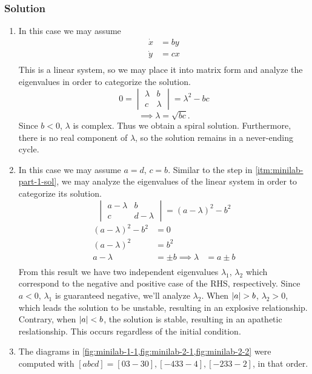 \documentclass[12pt]{article}
\begin{document}
\subsubsection*{Solution}
\begin{enumerate}
\item
  \label{itm:minilab-part-1-sol}
  In this case we may assume
  \begin{equation*}
    \begin{aligned}
      \dot{x} &= by \\
      \dot{y} &= cx \\
    \end{aligned}
  \end{equation*}
  This is a linear system, so we may place it into matrix form and analyze the
  eigenvalues in order to categorize the solution.
  \begin{equation*}
    0=\begin{vmatrix} \lambda & b \\ c & \lambda \end{vmatrix} = \lambda^2-bc
  \end{equation*}
  \begin{equation*}
    \implies \lambda = \sqrt{bc}.
  \end{equation*}
  Since $b<0$, $\lambda$ is complex. Thus we obtain a spiral solution.
  Furthermore, there is no real component of $\lambda$, so the solution remains
  in a never-ending cycle.
\item In this case we may assume $a=d$, $c=b$. Similar to the step in
  \cref{itm:minilab-part-1-sol}, we may analyze the eigenvalues of the linear
  system in order to categorize its solution.
  \begin{equation*}
    \begin{vmatrix} a-\lambda & b \\ c & d-\lambda \end{vmatrix} = (a-\lambda)^2-b^2
  \end{equation*}
  \begin{equation*}
    \begin{aligned}
      (a-\lambda)^2-b^2 &= 0 \\
      (a-\lambda)^2 &= b^2 \\
      a-\lambda &= \pm b
      \implies \lambda &= a\pm b \\
    \end{aligned}
  \end{equation*}
  From this result we have two independent eigenvalues $\lambda_1$, $\lambda_2$
  which correspond to the negative and positive case of the RHS, respectively.
  Since $a<0$, $\lambda_1$ is guaranteed negative, we'll analyze $\lambda_2$.
  When $\abs{a}>b$, $\lambda_2>0$, which leads the solution to be unstable,
  resulting in an explosive relationship. Contrary, when $\left|{a}\right|<b$, the
  solution is stable, resulting in an apathetic reslationship. This occurs
  regardless of the initial condition.
\item The diagrams in \cref{fig:minilab-1-1,fig:minilab-2-1,fig:minilab-2-2}
  were computed with $[a b c d]={[0 3 -3 0], [-4 3 3 -4], [-2 3 3 -2]}$, in that
  order.

\end{enumerate}
\end{document}
